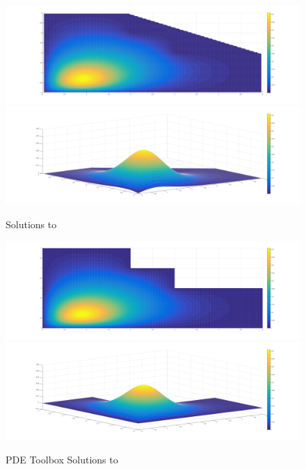 \documentclass[10pt,a4paper]{article}
\begin{document}
\begin{figure}[H]
\includegraphics[width=\linewidth]{figures/gaussian-top.png}
\includegraphics[width=\linewidth]{figures/gaussian-iso.png}
\caption{Solutions to }
\label{fig: gaussian solutions}
\end{figure}

\begin{figure}[H]
\includegraphics[width=\linewidth]{figures/gaussian-top-pdetool.png}
\includegraphics[width=\linewidth]{figures/gaussian-iso-pdetool.png}
\caption{PDE Toolbox Solutions to }
\label{fig: pdetool gaussian solutions}
\end{figure}
\end{document}
